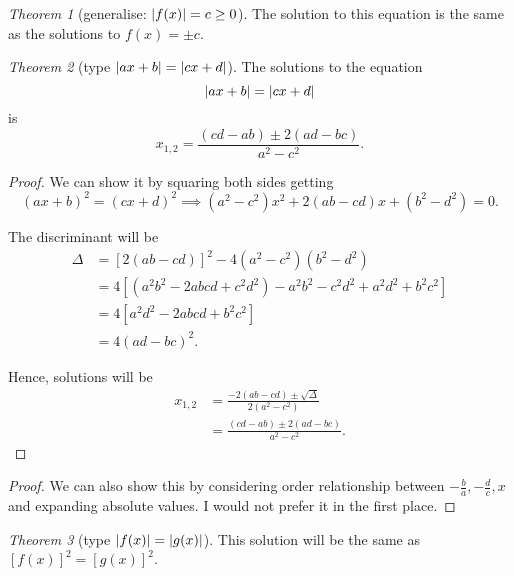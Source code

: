 \documentclass[8pt]{article}
\theoremstyle{remark}
\newtheorem{theorem}{Theorem}[section]
\begin{document}
        \begin{theorem}[generalise: $\left\lvert f(x) \right\rvert = c \geq 0$]
            The solution to this equation is the same as the solutions to $f(x) = \pm c$.
        \end{theorem}

        \begin{theorem}[type $\left\lvert ax + b \right\rvert = \left\lvert cx + d \right\rvert$]
            The solutions to the equation
            $$
            \left\lvert ax + b \right\rvert = \left\lvert cx + d \right\rvert
            $$
            is
            $$
            x_{1, 2} = \frac{(cd - ab) \pm 2 (ad - bc)}{a^2 - c^2}.
            $$

            \begin{proof}
                We can show it by squaring both sides getting
                $$
                (ax + b)^2 = (cx + d)^2 \implies (a^2 - c^2)x^2 + 2(ab - cd) x + (b^2 - d^2) = 0.
                $$

                The discriminant will be
                \begin{align*}
                    \Delta &= [2(ab - cd)]^2 - 4 (a^2 - c^2) (b^2 - d^2)\\
                    &= 4 [(a^2 b^2 - 2abcd + c^2 d^2) - a^2b^2 - c^2d^2 + a^2 d^2 + b^2 c^2]\\
                    &= 4 [a^2 d^2 - 2abcd + b^2 c^2]\\
                    &= 4 (ad - bc)^2.
                \end{align*}

                Hence, solutions will be
                \begin{align*}
                    x_{1, 2} &= \frac{- 2 (ab - cd) \pm \sqrt{\Delta}}{2 (a^2 - c^2)}\\
                    &= \frac{(cd - ab) \pm 2 (ad - bc)}{a^2 - c^2}.
                \end{align*}
            \end{proof}

            \begin{proof}
                We can also show this by considering order relationship between $-\frac{b}{a}, - \frac{d}{c}, x$ and expanding absolute values. I would not prefer it in the first place.
            \end{proof}
        \end{theorem}

        \begin{theorem}[type $\left\lvert f(x) \right\rvert = \left\lvert g(x) \right\rvert$]
            This solution will be the same as $[f(x)]^2 = [g(x)]^2$.
        \end{theorem}
\end{document}
